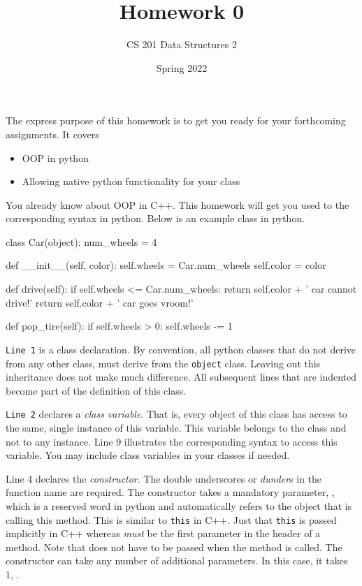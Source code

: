 \documentclass[a4paper]{exam}
\title{Homework 0}
\author{CS 201 Data Structures 2}
\date{Spring 2022}
\begin{document}
\maketitle

The express purpose of this homework is to get you ready for your forthcoming assignments. It covers
\begin{itemize}
\item OOP in python
\item Allowing native python functionality for your class
\end{itemize}

\begin{questions}

You already know about OOP in C++. This homework will get you used to the corresponding syntax in python. Below is an example class in python.

\begin{python}
class Car(object):
    num_wheels = 4

    def __init__(self, color):
        self.wheels = Car.num_wheels
        self.color = color

    def drive(self):
        if self.wheels <= Car.num_wheels:
            return self.color + ' car cannot drive!'
        return self.color + ' car goes vroom!'

    def pop_tire(self):
        if self.wheels > 0:
            self.wheels -= 1
\end{python}

\texttt{Line 1} is a class declaration. By convention, all python classes that do not derive from any other class, must derive from the \texttt{object} class. Leaving out this inheritance does not make much difference. All subsequent lines that are indented become part of the definition of this class.

\texttt{Line 2} declares a \textit{class variable}. That is, every object of this class has access to the same, single instance of this variable. This variable belongs to the class and not to any instance. Line 9 illustrates the corresponding syntax to access this variable. You may include class variables in your classes if needed.

Line 4 declares the \textit{constructor}. The double underscores or \textit{dunder}s in the function name are required. The constructor takes a mandatory parameter, , which is a reserved word in python and automatically refers to the object that is calling this method. This is similar to \texttt{this} in C++. Just that \texttt{this} is passed implicitly in C++ whereas  \textit{must} be the first parameter in the header of a method. Note that  does not have to be passed when the method is called. The constructor can take any number of additional parameters. In this case, it takes 1, .


\end{questions}
\end{document}

